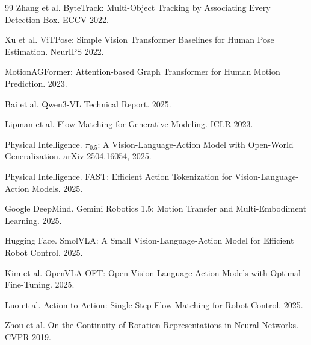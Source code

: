 \documentclass[letterpaper, 10pt, conference]{ieeeconf}
\begin{document}
\begin{thebibliography}{99}
Zhang et al. ByteTrack: Multi-Object Tracking by Associating Every Detection Box. ECCV 2022.

Xu et al. ViTPose: Simple Vision Transformer Baselines for Human Pose Estimation. NeurIPS 2022.

MotionAGFormer: Attention-based Graph Transformer for Human Motion Prediction. 2023.

Bai et al. Qwen3-VL Technical Report. 2025.

Lipman et al. Flow Matching for Generative Modeling. ICLR 2023.

Physical Intelligence. $\pi_{0.5}$: A Vision-Language-Action Model with Open-World Generalization. arXiv 2504.16054, 2025.

Physical Intelligence. FAST: Efficient Action Tokenization for Vision-Language-Action Models. 2025.

Google DeepMind. Gemini Robotics 1.5: Motion Transfer and Multi-Embodiment Learning. 2025.

Hugging Face. SmolVLA: A Small Vision-Language-Action Model for Efficient Robot Control. 2025.

Kim et al. OpenVLA-OFT: Open Vision-Language-Action Models with Optimal Fine-Tuning. 2025.

Luo et al. Action-to-Action: Single-Step Flow Matching for Robot Control. 2025.


Zhou et al. On the Continuity of Rotation Representations in Neural Networks. CVPR 2019.

\end{thebibliography}
\end{document}
